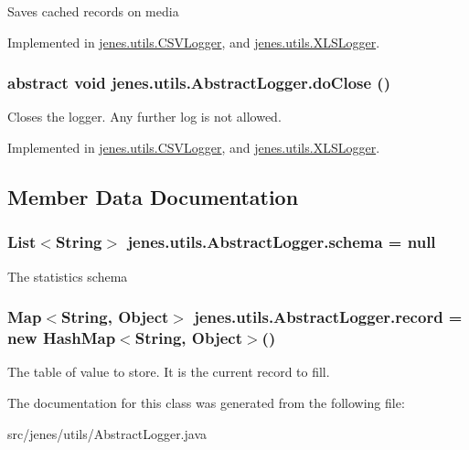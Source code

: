 Saves cached records on media 

Implemented in \hyperlink{classjenes_1_1utils_1_1_c_s_v_logger_09a4f4fc362db6d4090d75642521ee65}{jenes.utils.CSVLogger}, and \hyperlink{classjenes_1_1utils_1_1_x_l_s_logger_54c54393bf5a31442ebfc10517dfceea}{jenes.utils.XLSLogger}.\hypertarget{classjenes_1_1utils_1_1_abstract_logger_5253672b3f3f81287db2fc604ca921a9}{
\subsubsection[doClose]{\setlength{\rightskip}{0pt plus 5cm}abstract void jenes.utils.AbstractLogger.doClose ()}}
\label{classjenes_1_1utils_1_1_abstract_logger_5253672b3f3f81287db2fc604ca921a9}


Closes the logger. Any further log is not allowed. 

Implemented in \hyperlink{classjenes_1_1utils_1_1_c_s_v_logger_c89f6fe5bd609fcc02ca7adf1407f279}{jenes.utils.CSVLogger}, and \hyperlink{classjenes_1_1utils_1_1_x_l_s_logger_cf58ddaa6873bcf626c9d24064a89b73}{jenes.utils.XLSLogger}.

\subsection{Member Data Documentation}
\hypertarget{classjenes_1_1utils_1_1_abstract_logger_3a2030876857a0512fae7e0ad400c570}{
\subsubsection[schema]{\setlength{\rightskip}{0pt plus 5cm}List$<$String$>$ {\bf jenes.utils.AbstractLogger.schema} = null}}
\label{classjenes_1_1utils_1_1_abstract_logger_3a2030876857a0512fae7e0ad400c570}


The statistics schema \hypertarget{classjenes_1_1utils_1_1_abstract_logger_e85e356ad12255a9c5ec8f9f25659ef7}{
\subsubsection[record]{\setlength{\rightskip}{0pt plus 5cm}Map$<$String, Object$>$ {\bf jenes.utils.AbstractLogger.record} = new HashMap$<$String, Object$>$()}}
\label{classjenes_1_1utils_1_1_abstract_logger_e85e356ad12255a9c5ec8f9f25659ef7}


The table of value to store. It is the current record to fill. 

The documentation for this class was generated from the following file:\begin{CompactItemize}
\item 
src/jenes/utils/AbstractLogger.java\end{CompactItemize}
